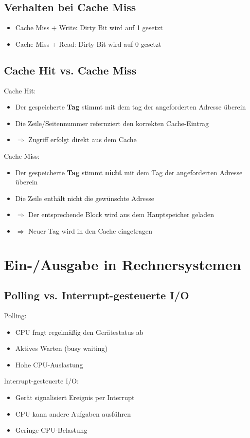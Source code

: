 \documentclass{kit}
\begin{document}
  \subsection{Verhalten bei Cache Miss}
    \begin{itemize}
      \item Cache Miss + Write: Dirty Bit wird auf 1 gesetzt
      \item Cache Miss + Read: Dirty Bit wird auf 0 gesetzt
    \end{itemize}
  \subsection{Cache Hit vs. Cache Miss}
    Cache Hit:
    \begin{itemize}
      \item Der gespeicherte \textbf{Tag} stimmt mit dem tag der angeforderten Adresse überein
      \item Die Zeile/Seitennummer refernziert den korrekten Cache-Eintrag
      \item $\Rightarrow$ Zugriff erfolgt direkt aus dem Cache
    \end{itemize}
    Cache Miss:
    \begin{itemize}
      \item Der gespeicherte \textbf{Tag} stimmt \textbf{nicht} mit dem Tag der angeforderten Adresse
        überein
      \item Die Zeile enthält nicht die gewünschte Adresse
      \item $\Rightarrow$ Der entsprechende Block wird aus dem Hauptspeicher geladen
      \item $\Rightarrow$ Neuer Tag wird in den Cache eingetragen
    \end{itemize}
\section{Ein-/Ausgabe in Rechnersystemen}
  \subsection{Polling vs. Interrupt-gesteuerte I/O}
    Polling:
    \begin{itemize}
      \item CPU fragt regelmäßig den Gerätestatus ab
      \item Aktives Warten (busy waiting)
      \item Hohe CPU-Auslastung
    \end{itemize}
    Interrupt-gesteuerte I/O:
    \begin{itemize}
      \item Gerät signalisiert Ereignis per Interrupt
      \item CPU kann andere Aufgaben ausführen
      \item Geringe CPU-Belastung
    \end{itemize}
\end{document}

